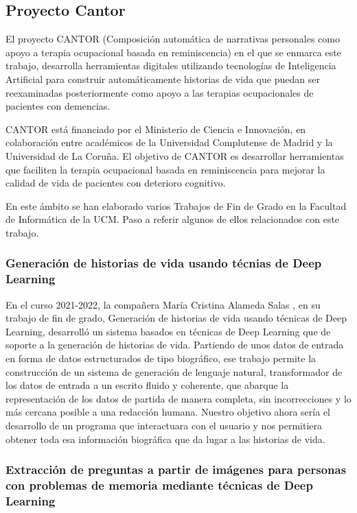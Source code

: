 \subsection{Proyecto Cantor}
El proyecto CANTOR (Composición automática de narrativas personales como apoyo a terapia ocupacional basada en reminiscencia) en el que se enmarca este trabajo, desarrolla herramientas digitales utilizando tecnologías de Inteligencia Artificial para construir automáticamente historias de vida que puedan ser reexaminadas posteriormente como apoyo a las terapias ocupacionales de pacientes con demencias.

CANTOR está financiado por el Ministerio de Ciencia e Innovación, en colaboración entre académicos de la Universidad Complutense de Madrid y la Universidad de La Coruña. El objetivo de CANTOR es desarrollar herramientas que faciliten la terapia ocupacional basada en reminiscencia para mejorar la calidad de vida de pacientes con deterioro cognitivo.

En este ámbito se han elaborado varios Trabajos de Fin de Grado en la Facultad de Informática de la UCM. Paso a referir algunos de ellos relacionados con este trabajo. 

\subsubsection{Generación de historias de vida usando técnias de Deep Learning}
\label{sec:trabajocristina}
En el curso 2021-2022, la compañera María Cristina Alameda Salas \citep{cristinaalameda}, en su trabajo de fin de grado, Generación de historias de vida
usando técnicas de Deep Learning, desarrolló un sistema basados en técnicas
de Deep Learning que de soporte a la generación de historias de vida. Partiendo de unos datos de entrada en forma de datos estructurados de tipo biográfico, ese trabajo permite la construcción de un sistema de generación de lenguaje natural, transformador de los datos de entrada a un escrito fluido y coherente, que abarque la representación de los datos de partida de manera completa, sin incorrecciones y lo más cercana posible a una redacción humana. Nuestro objetivo ahora sería el desarrollo de un programa que interactuara con el usuario y nos permitiera obtener toda esa información biográfica que da lugar a las historias de vida. 
\subsubsection{Extracción de preguntas a partir de imágenes para personas con problemas de memoria mediante técnicas de Deep Learning}

